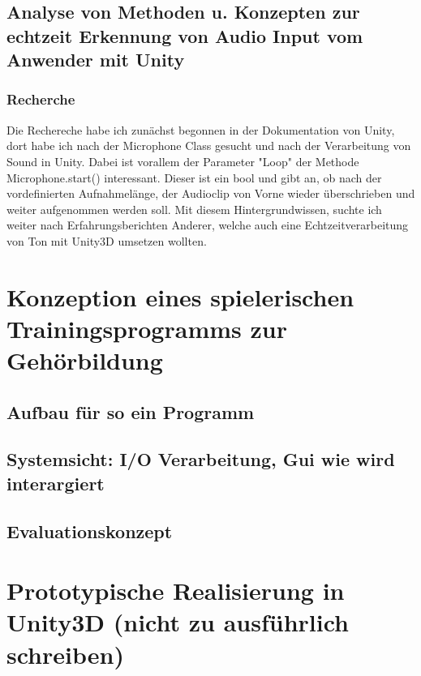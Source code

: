 	\section{Analyse von Methoden u. Konzepten zur echtzeit Erkennung von Audio Input vom Anwender mit Unity}
		\subsection{Recherche}
			Die Rechereche habe ich zunächst begonnen in der Dokumentation von Unity, dort habe ich nach der Microphone Class gesucht und nach der Verarbeitung von Sound in Unity. \cite{unity_doku_micro} 
			Dabei ist vorallem der Parameter "Loop" der Methode Microphone.start() interessant. Dieser ist ein bool und gibt an, ob nach der vordefinierten Aufnahmelänge, der Audioclip von Vorne wieder überschrieben und weiter aufgenommen werden soll. \cite{unity_doku_micro_start}
			Mit diesem Hintergrundwissen, suchte ich weiter nach Erfahrungsberichten Anderer, welche auch eine Echtzeitverarbeitung von Ton mit Unity3D umsetzen wollten.

\chapter{Konzeption eines spielerischen Trainingsprogramms zur Gehörbildung}
\section{Aufbau für so ein Programm}
\section{Systemsicht: I/O Verarbeitung, Gui wie wird interargiert}
\section{Evaluationskonzept}

\chapter{Prototypische Realisierung in Unity3D (nicht zu ausführlich schreiben)}


